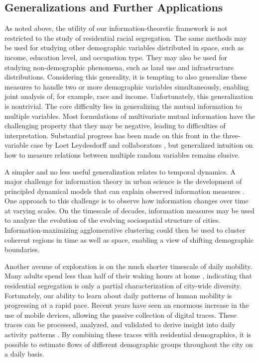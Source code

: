 \documentclass[english]{scrartcl}
\begin{document}
	\subsection*{Generalizations and Further Applications}

		As noted above, the utility of our information-theoretic framework is not restricted to the study of residential racial segregation. The same methods may be used for studying other demographic variables distributed in space, such as income, education level, and occupation type. They may also be used for studying non-demographic phenomena, such as land use and infrastructure distributions. Considering this generality, it is tempting to also generalize these measures to handle two or more demographic variables simultaneously, enabling joint analysis of, for example, race and income. Unfortunately, this generalization is nontrivial. The core difficulty lies in generalizing the mutual information to multiple variables. Most formulations of multivariate mutual information have the challenging property that they may be negative, leading to difficulties of interpretation.  Substantial progress has been made on this front in the three-variable case by Loet Leydesdorff and collaborators \cite{Leydesdorff2014,Leydesdorff2015,Leydesdorff2013}, but generalized intuition on how to measure relations between multiple random variables remains elusive. 

		A simpler and no less useful generalization relates to temporal dynamics. A major challenge for information theory in urban science is the development of principled dynamical models that can explain observed information measures \cite{Batty2014a}. One approach to this challenge is to observe how information changes over time at varying scales. On the timescale of decades, information measures may be used to analyze the evolution of the evolving sociospatial structure of cities. Information-maximizing agglomerative clustering could then be used to cluster coherent regions in time as well as space, enabling a view of shifting demographic boundaries.

		Another avenue of exploration is on the much shorter timescale of daily mobility. Many adults spend less than half of their waking hours at home \cite{BureauofLaborStati2014}, indicating that residential segregation is only a partial characterization of city-wide diversity. Fortunately, our ability to learn about daily patterns of human mobility is progressing at a rapid pace. Recent years have seen an enormous increase in the use of mobile devices, allowing the passive collection of digital traces. These traces can be processed, analyzed, and validated to derive insight into daily activity patterns \cite{Widhalm2015,Yang,Jiang2013,Jiang2012c}. By combining these traces with residential demographics, it is possible to estimate flows of different demographic groups throughout the city on a daily basis. 
\end{document}
